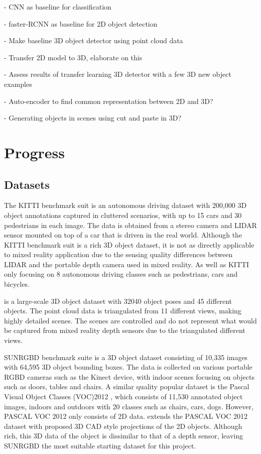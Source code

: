 \documentclass[11pt]{article}
\begin{document}
- CNN as baseline for classification

- faster-RCNN as baseline for 2D object detection

- Make baseline 3D object detector using point cloud data

- Transfer 2D model to 3D, elaborate on this

- Assess results of transfer learning 3D detector with a few 3D new object examples

- Auto-encoder to find common representation between 2D and 3D?

- Generating objects in scenes using cut and paste in 3D?

\section{Progress}
\subsection*{Datasets}
The KITTI benchmark suit \cite{KITTI} is an autonomous driving dataset with 200,000 3D object annotations captured in cluttered scenarios, with up to 15 cars and 30 pedestrians in each image. The data is obtained from a stereo camera and LIDAR sensor mounted on top of a car that is driven in the real world. Although the KITTI benchmark suit is a rich 3D object dataset, it is not as directly applicable to mixed reality application due to the sensing quality differences between LIDAR and the portable depth camera used in mixed reality. As well as KITTI only focusing on 8 autonomous driving classes such as pedestrians, cars and bicycles. 

\cite{3D_dataset} is a large-scale 3D object dataset with 32040 object poses and 45 different objects. The point cloud data is triangulated from 11 different views, making highly detailed scenes. The scenes are controlled and do not represent what would be captured from mixed reality depth sensors due to the triangulated different views.

SUNRGBD benchmark suite \cite{SUNRGBD} is a 3D object dataset consisting of 10,335 images with 64,595 3D object bounding boxes. The data is collected on various portable RGBD cameras such as the Kinect device, with indoor scenes focusing on objects such as doors, tables and chairs. A similar quality popular dataset is the Pascal Visual Object Classes (VOC)2012 \cite{pascal-voc-2012}, which consists of 11,530 annotated object images, indoors and outdoors with 20 classes such as chairs, cars, dogs. However, PASCAL VOC 2012 only consists of 2D data. \cite{PASCAL_3D} extends the PASCAL VOC 2012 dataset with proposed 3D CAD style projections of the 2D objects. Although rich, this 3D data of the object is dissimilar to that of a depth sensor, leaving SUNRGBD the most suitable starting dataset for this project.
\end{document}
